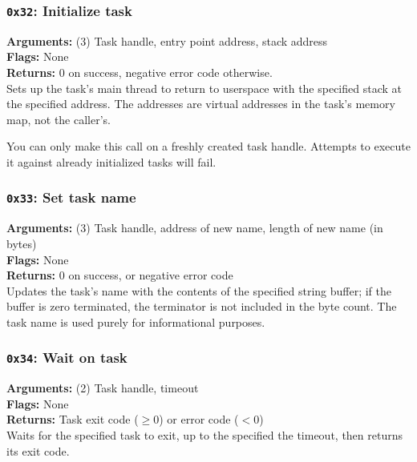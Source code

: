 \documentclass[11pt]{article}
\begin{document}
\subsubsection{{\tt 0x32}: Initialize task}
\textbf{Arguments:} (3) Task handle, entry point address, stack address \\
\textbf{Flags:} None \\
\textbf{Returns:} 0 on success, negative error code otherwise. \\

Sets up the task's main thread to return to userspace with the specified stack at the specified address. The addresses are virtual addresses in the task's memory map, not the caller's.

You can only make this call on a freshly created task handle. Attempts to execute it against already initialized tasks will fail.

\subsubsection{{\tt 0x33}: Set task name}
\textbf{Arguments:} (3) Task handle, address of new name, length of new name (in bytes) \\
\textbf{Flags:} None \\
\textbf{Returns:} 0 on success, or negative error code \\

Updates the task's name with the contents of the specified string buffer; if the buffer is zero terminated, the terminator is not included in the byte count. The task name is used purely for informational purposes.

\subsubsection{{\tt 0x34}: Wait on task}
\textbf{Arguments:} (2) Task handle, timeout \\
\textbf{Flags:} None \\
\textbf{Returns:} Task exit code ($\geq0$) or error code ($<0$) \\

Waits for the specified task to exit, up to the specified the timeout, then returns its exit code.
\end{document}
